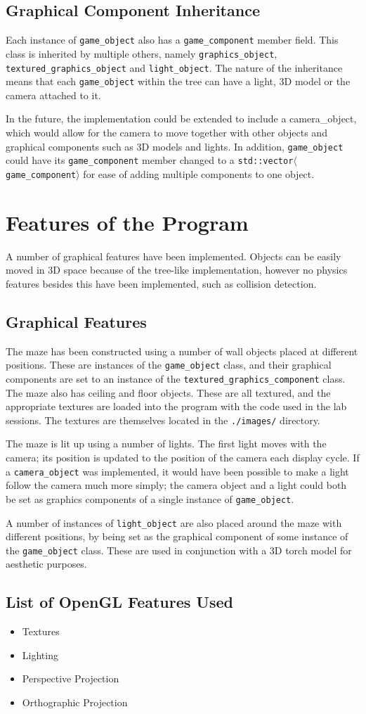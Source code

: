 \documentclass{article}
\begin{document}
	\subsection{Graphical Component Inheritance}
	Each instance of \texttt{game\_object} also has a \texttt{game\_component} member field.
	This class is inherited by multiple others, namely \texttt{graphics\_object}, \texttt{textured\_graphics\_object} and \texttt{light\_object}.
	The nature of the inheritance means that each \texttt{game\_object} within the tree can have a light, 3D model or the camera attached to it.
	\par
	In the future, the implementation could be extended to include a camera\_object, which would allow for the camera to move together with other objects and graphical components such as 3D models and lights.
	In addition, \texttt{game\_object} could have its \texttt{game\_component} member changed to a \texttt{std::vector$\langle$game\_component$\rangle$} for ease of adding multiple components to one object.
	
	\newpage
	\section{Features of the Program}
	A number of graphical features have been implemented. Objects can be easily moved in 3D space because of the tree-like implementation, however no physics features besides this have been implemented, such as collision detection.
	\subsection{Graphical Features}
	The maze has been constructed using a number of wall objects placed at different positions.
	These are instances of the \texttt{game\_object} class, and their graphical components are set to an instance of the \texttt{textured\_graphics\_component} class.
	The maze also has ceiling and floor objects. These are all textured, and the appropriate textures are loaded into the program with the code used in the lab sessions. The textures are themselves located in the \texttt{./images/} directory.
	\par
	The maze is lit up using a number of lights. The first light moves with the camera; its position is updated to the position of the camera each display cycle. If a \texttt{camera\_object} was implemented, it would have been possible to make a light follow the camera much more simply; the camera object and a light could both be set as graphics components of a single instance of \texttt{game\_object}.
	\par
	A number of instances of \texttt{light\_object} are also placed around the maze with different positions, by being set as the graphical component of some instance of the \texttt{game\_object} class. These are used in conjunction with a 3D torch model for aesthetic purposes.
	
	\subsection{List of OpenGL Features Used}
    \begin{itemize}
    	\item
    	Textures
    	\item
    	Lighting
    	\item
    	Perspective Projection
    	\item
    	Orthographic Projection
    	
    \end{itemize}
\end{document}
